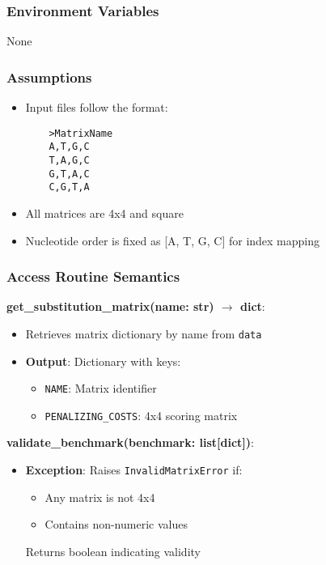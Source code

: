 \documentclass[12pt, titlepage]{article}
\begin{document}
\subsubsection{Environment Variables}

None

\subsubsection{Assumptions}

\begin{itemize}
    \item Input files follow the format:
    \begin{verbatim}
    >MatrixName
    A,T,G,C
    T,A,G,C
    G,T,A,C
    C,G,T,A
    \end{verbatim}
    \item All matrices are 4x4 and square
    \item Nucleotide order is fixed as [A, T, G, C] for index mapping
\end{itemize}

\subsubsection{Access Routine Semantics}

\noindent \textbf{get\_substitution\_matrix(name: str) $\rightarrow$ dict}:
\begin{itemize}
    \item Retrieves matrix dictionary by name from \texttt{data}
    \item \textbf{Output}: Dictionary with keys:
    \begin{itemize}
        \item \texttt{NAME}: Matrix identifier
        \item \texttt{PENALIZING\_COSTS}: 4x4 scoring matrix
    \end{itemize}
\end{itemize}

\noindent \textbf{validate\_benchmark(benchmark: list[dict])}:
\begin{itemize}
    \item \textbf{Exception}: Raises \texttt{InvalidMatrixError} if:
    \begin{itemize}
        \item Any matrix is not 4x4
        \item Contains non-numeric values
    \end{itemize}
    Returns boolean indicating validity
\end{itemize}
\end{document}

